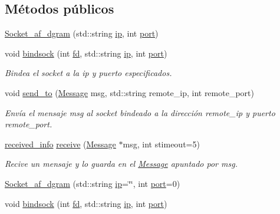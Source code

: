 \subsection*{Métodos públicos}
\begin{DoxyCompactItemize}
\item 
\hyperlink{classSocket__af__dgram_a11391f68bb56dafa6be879f388e4b0cd}{Socket\+\_\+af\+\_\+dgram} (std\+::string \hyperlink{classSocket__base_aed490170422026c6dfe5def12031cd04}{ip}, int \hyperlink{classSocket__base_afcdd7ae81a9fb867d012b7db8c259576}{port})
\item 
void \hyperlink{classSocket__af__dgram_a6a2084d50ab117b0bf6b699aa0573db5}{bindsock} (int \hyperlink{classSocket__base_a740aedbac3269e4981732dd6842cd9c2}{fd}, std\+::string \hyperlink{classSocket__base_aed490170422026c6dfe5def12031cd04}{ip}, int \hyperlink{classSocket__base_afcdd7ae81a9fb867d012b7db8c259576}{port})
\begin{DoxyCompactList}\small\item\em Bindea el socket a la ip y puerto especificados. \end{DoxyCompactList}\item 
void \hyperlink{classSocket__af__dgram_a744bb661eeebe5b5cdfca0028da6bd88}{send\+\_\+to} (\hyperlink{structMessage}{Message} msg, std\+::string remote\+\_\+ip, int remote\+\_\+port)
\begin{DoxyCompactList}\small\item\em Envía el mensaje {\itshape msg} al socket bindeado a la dirección {\itshape remote\+\_\+ip} y puerto {\itshape remote\+\_\+port}. \end{DoxyCompactList}\item 
\hyperlink{structreceived__info}{received\+\_\+info} \hyperlink{classSocket__af__dgram_ac7d122d2317d980c48964076c3c7e2bb}{receive} (\hyperlink{structMessage}{Message} $\ast$msg, int stimeout=5)
\begin{DoxyCompactList}\small\item\em Recive un mensaje y lo guarda en el \hyperlink{structMessage}{Message} apuntado por {\itshape msg}. \end{DoxyCompactList}\item 
\hyperlink{classSocket__af__dgram_a41bd41eb63d780e446275dc5eb320334}{Socket\+\_\+af\+\_\+dgram} (std\+::string \hyperlink{classSocket__base_aed490170422026c6dfe5def12031cd04}{ip}=\char`\"{}\char`\"{}, int \hyperlink{classSocket__base_afcdd7ae81a9fb867d012b7db8c259576}{port}=0)
\item 
void \hyperlink{classSocket__af__dgram_a6a2084d50ab117b0bf6b699aa0573db5}{bindsock} (int \hyperlink{classSocket__base_a740aedbac3269e4981732dd6842cd9c2}{fd}, std\+::string \hyperlink{classSocket__base_aed490170422026c6dfe5def12031cd04}{ip}, int \hyperlink{classSocket__base_afcdd7ae81a9fb867d012b7db8c259576}{port})

\end{DoxyCompactItemize}
